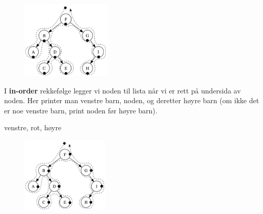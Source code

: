 \documentclass[12pt]{report}
\begin{document}
\par 



\begin{figure}[H]
\advance\leftskip 5.05in		\includegraphics[width=1.7in,height=1.47in]{./media/image106.png}
\end{figure}



\par

I \textbf{in-order} rekkefølge legger vi noden til lista når vi er rett på undersida av noden. Her printer man venstre barn, noden, og deretter høyre barn (om ikke det er noe venstre barn, print noden før høyre barn).\  \par

 venstre, rot, høyre\par

\par 

\vspace{\baselineskip}



\begin{figure}[H]
\advance\leftskip 5.05in		\includegraphics[width=1.65in,height=1.43in]{./media/image107.png}
\end{figure}
\end{document}
